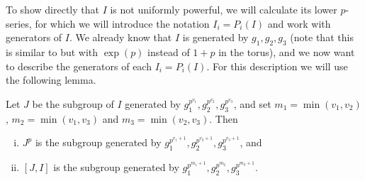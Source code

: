 To show directly that $I$ is not uniformly powerful, we will calculate its lower $p$-series, for which we will introduce the notation $I_{i} = P_{i}(I)$ and work with generators of $I$. We already know that $I$ is generated by $g_{1},g_{2},g_{3}$ (note that this is similar to \cite[Thm.~2.4.1]{Generators} but with $\exp(p)$ instead of $1+p$ in the torus), and we now want to describe the generators of each $I_{i} = P_{i}(I)$. For this description we will use the following lemma.

\begin{lemma}\label{lem:J-I-com}
  Let $J$ be the subgroup of $I$ generated by $g_{1}^{p^{v_{1}}}, g_{2}^{p^{v_{2}}}, g_{3}^{p^{v_{3}}}$, and set $m_{1} = \min(v_{1},v_{2})$, $m_{2} = \min(v_{1},v_{3})$ and $m_{3} = \min(v_{2},v_{3})$. Then
  \begin{enumerate}[(i)]
    \item $J^{p}$ is the subgroup generated by $g_{1}^{p^{v_{1}+1}}, g_{2}^{p^{v_{2}+1}}, g_{3}^{p^{v_{3}+1}}$, and
    \item $[J,I]$ is the subgroup generated by $g_{1}^{p^{m_{1}+1}}, g_{2}^{p^{m_{2}}}, g_{3}^{p^{m_{3}+1}}$.
  \end{enumerate}
\end{lemma}

